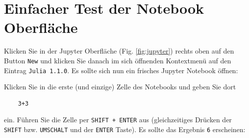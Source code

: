 \documentclass[11pt, a4paper]{scrartcl}
\begin{document}
	
	
	
	
	
	
	
	
	
	
	
	
	\newpage
	\section{Einfacher Test der Notebook Oberfläche}
	
	Klicken Sie in der Jupyter Oberfläche (Fig. \ref{fig:jupyter}) rechts oben auf den Button \texttt{New} und klicken Sie danach im sich öffnenden Kontextmenü auf den Eintrag \texttt{Julia 1.1.0}. Es sollte sich nun ein frisches Jupyter Notebook öffnen:
	
	\begin{figure}[h!]
	\centering
	\end{figure}

	Klicken Sie in die erste (und einzige) Zelle des Notebooks und geben Sie dort
	
	\begin{lstlisting}
	3+3
	\end{lstlisting}
	ein. Führen Sie die Zelle per \texttt{SHIFT + ENTER} aus (gleichzeitiges Drücken der \texttt{SHIFT} bzw. \texttt{UMSCHALT} und der \texttt{ENTER} Taste). Es sollte das Ergebnis \texttt{6} erscheinen:

	\begin{figure}[h!]
	\centering
	\end{figure}	
\end{document}
